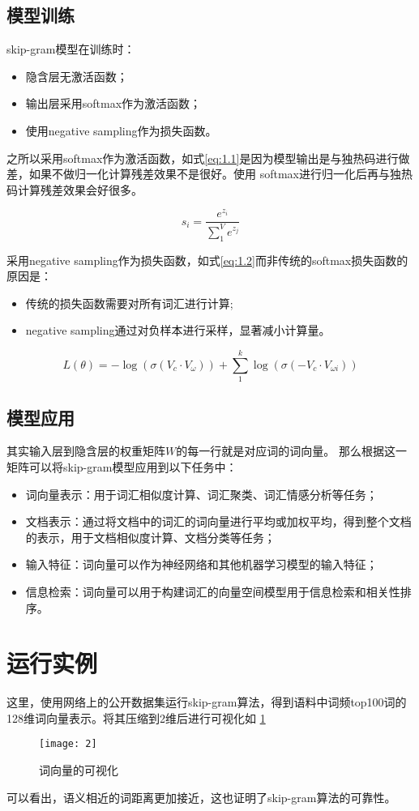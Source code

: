 \documentclass[withoutpreface,bwprint]{cumcmthesis}
\begin{document}
\subsection{模型训练}

skip-gram模型在训练时：
\begin{itemize}
    \item 隐含层无激活函数；
    \item 输出层采用softmax作为激活函数；
    \item 使用negative sampling作为损失函数。
\end{itemize}

之所以采用softmax作为激活函数，如式\cref{eq:1.1}是因为模型输出是与独热码进行做差，如果不做归一化计算残差效果不是很好。使用
softmax进行归一化后再与独热码计算残差效果会好很多。

\begin{equation}
    s_i=\frac{e^{z_i}}{\sum_1^V{e^{z_j}}}
    \label{eq:1.1}
\end{equation}

采用negative sampling作为损失函数，如式\cref{eq:1.2}而非传统的softmax损失函数的原因是：
\begin{itemize}
    \item 传统的损失函数需要对所有词汇进行计算;
    \item negative sampling通过对负样本进行采样，显著减小计算量。
\end{itemize}

\begin{equation}
    L(\theta)=-\log{(\sigma(V_c\cdot V_\omega))}+\sum_1^k{\log{(\sigma(-V_c\cdot V_{\omega i}))}}
    \label{eq:1.2}
\end{equation}

\subsection{模型应用}

其实输入层到隐含层的权重矩阵$W$的每一行就是对应词的词向量。
那么根据这一矩阵可以将skip-gram模型应用到以下任务中：
\begin{itemize}
    \item 词向量表示：用于词汇相似度计算、词汇聚类、词汇情感分析等任务；
    \item 文档表示：通过将文档中的词汇的词向量进行平均或加权平均，得到整个文档的表示，用于文档相似度计算、文档分类等任务；
    \item 输入特征：词向量可以作为神经网络和其他机器学习模型的输入特征；
    \item 信息检索：词向量可以用于构建词汇的向量空间模型用于信息检索和相关性排序。
\end{itemize}

\section{运行实例}

这里，使用网络上的公开数据集运行skip-gram算法，得到语料中词频top100词的128维词向量表示。将其压缩到2维后进行可视化如
\cref{fig:2.1}

\begin{figure}[H]
    \centering
    \texttt{[image: 2]}
    \caption{词向量的可视化}
    \label{fig:2.1}
\end{figure}

可以看出，语义相近的词距离更加接近，这也证明了skip-gram算法的可靠性。
\end{document}
